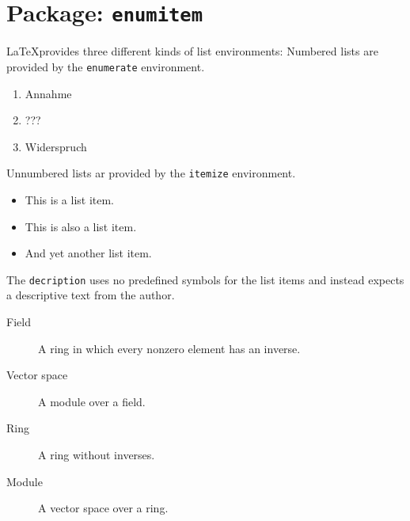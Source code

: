 \documentclass[a4paper, 10pt, abstract=on, headings=standardclasses]{scrartcl}
\begin{document}
\section{Package: \texttt{enumitem}}

\LaTeX provides three different kinds of list environments:
Numbered lists are provided by the \texttt{enumerate} environment.
\begin{LTXexample}[pos = r]
  \begin{enumerate}
    \item
      Annahme
    \item
      ???
    \item
      Widerspruch
  \end{enumerate}
\end{LTXexample}
Unnumbered lists ar provided by the \texttt{itemize} environment.
\begin{LTXexample}[pos = r]
  \begin{itemize}
    \item
      This is a list item.
    \item
      This is also a list item.
    \item
      And yet another list item.
  \end{itemize}
\end{LTXexample}
The \texttt{decription} uses no predefined symbols for the list items and instead expects a descriptive text from the author.
\begin{LTXexample}[pos = r]
  \begin{description}
    \item[Field]
      A ring in which every nonzero element has an inverse.
    \item[Vector space]
      A module over a field.
    \item[Ring]
      A ring without inverses.
    \item[Module]
      A vector space over a ring.
  \end{description}
\end{LTXexample}
\end{document}
